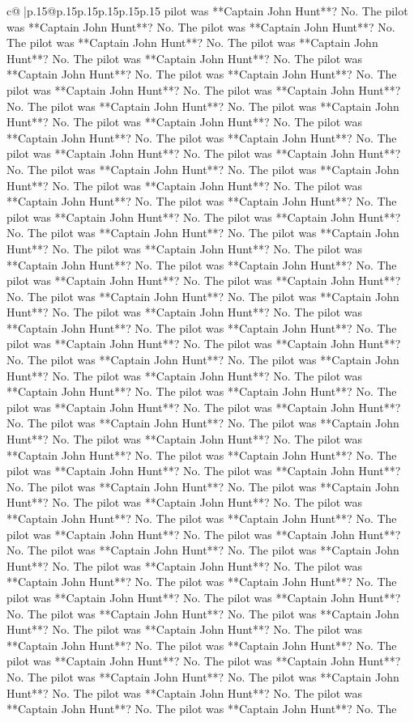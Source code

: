\documentclass{article}
\begin{document}
{\begin{supertabular}{c@{$\;$}|p{.15\linewidth}@{}p{.15\linewidth}p{.15\linewidth}p{.15\linewidth}p{.15\linewidth}p{.15\linewidth}}
{{{pilot was **Captain John Hunt**? No. The pilot was **Captain John Hunt**? No. The pilot was **Captain John Hunt**? No. The pilot was **Captain John Hunt**? No. The pilot was **Captain John Hunt**? No. The pilot was **Captain John Hunt**? No. The pilot was **Captain John Hunt**? No. The pilot was **Captain John Hunt**? No. The pilot was **Captain John Hunt**? No. The pilot was **Captain John Hunt**? No. The pilot was **Captain John Hunt**? No. The pilot was **Captain John Hunt**? No. The pilot was **Captain John Hunt**? No. The pilot was **Captain John Hunt**? No. The pilot was **Captain John Hunt**? No. The pilot was **Captain John Hunt**? No. The pilot was **Captain John Hunt**? No. The pilot was **Captain John Hunt**? No. The pilot was **Captain John Hunt**? No. The pilot was **Captain John Hunt**? No. The pilot was **Captain John Hunt**? No. The pilot was **Captain John Hunt**? No. The pilot was **Captain John Hunt**? No. The pilot was **Captain John Hunt**? No. The pilot was **Captain John Hunt**? No. The pilot was **Captain John Hunt**? No. The pilot was **Captain John Hunt**? No. The pilot was **Captain John Hunt**? No. The pilot was **Captain John Hunt**? No. The pilot was **Captain John Hunt**? No. The pilot was **Captain John Hunt**? No. The pilot was **Captain John Hunt**? No. The pilot was **Captain John Hunt**? No. The pilot was **Captain John Hunt**? No. The pilot was **Captain John Hunt**? No. The pilot was **Captain John Hunt**? No. The pilot was **Captain John Hunt**? No. The pilot was **Captain John Hunt**? No. The pilot was **Captain John Hunt**? No. The pilot was **Captain John Hunt**? No. The pilot was **Captain John Hunt**? No. The pilot was **Captain John Hunt**? No. The pilot was **Captain John Hunt**? No. The pilot was **Captain John Hunt**? No. The pilot was **Captain John Hunt**? No. The pilot was **Captain John Hunt**? No. The pilot was **Captain John Hunt**? No. The pilot was **Captain John Hunt**? No. The pilot was **Captain John Hunt**? No. The pilot was **Captain John Hunt**? No. The pilot was **Captain John Hunt**? No. The pilot was **Captain John Hunt**? No. The pilot was **Captain John Hunt**? No. The pilot was **Captain John Hunt**? No. The pilot was **Captain John Hunt**? No. The pilot was **Captain John Hunt**? No. The pilot was **Captain John Hunt**? No. The pilot was **Captain John Hunt**? No. The pilot was **Captain John Hunt**? No. The pilot was **Captain John Hunt**? No. The pilot was **Captain John Hunt**? No. The pilot was **Captain John Hunt**? No. The pilot was **Captain John Hunt**? No. The pilot was **Captain John Hunt**? No. The pilot was **Captain John Hunt**? No. The pilot was **Captain John Hunt**? No. The pilot was **Captain John Hunt**? No. The pilot was **Captain John Hunt**? No. The pilot was **Captain John Hunt**? No. The pilot was **Captain John Hunt**? No. The pilot was **Captain John Hunt**? No. The pilot was **Captain John Hunt**? No. The pilot was **Captain John Hunt**? No. The pilot was **Captain John Hunt**? No. The pilot was **Captain John Hunt**? No. The pilot was **Captain John Hunt**? No. The pilot was **Captain John Hunt**? No. The pilot was **Captain John Hunt**? No. The }}}
\end{supertabular}}
\end{document}
